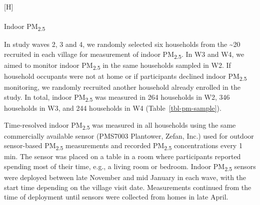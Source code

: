 \documentclass[
  letterpaper,
  DIV=11,
  numbers=noendperiod]{scrartcl}
\makeatletter
\let\oldparagraph\paragraph
\renewcommand{\paragraph}{
    \@ifstar
      \xxxParagraphStar
      \xxxParagraphNoStar
  }
\newcommand{\xxxParagraphStar}[1]{\oldparagraph*{#1}\mbox{}}
\newcommand{\xxxParagraphNoStar}[1]{\oldparagraph{#1}\mbox{}}
\renewenvironment{figure}%
   {\renewcommand\familydefault\sfdefault
    \@float{figure}}
   {\end@float}
\makeatother
\begin{document}
\begin{figure}[H]


\caption{\label{fig-calibration}Calibration of real-time sensors against
a reference monitor at University of the Chinese Academy of Sciences.}

\end{figure}%

\paragraph{\texorpdfstring{Indoor
PM\textsubscript{2.5}}{Indoor PM2.5}}\label{indoor-pm2.5}

In study waves 2, 3 and 4, we randomly selected six households from the
\textasciitilde20 recruited in each village for measurement of indoor
PM\textsubscript{2.5}. In W3 and W4, we aimed to monitor indoor
PM\textsubscript{2.5} in the same households sampled in W2. If household
occupants were not at home or if participants declined indoor
PM\textsubscript{2.5} monitoring, we randomly recruited another
household already enrolled in the study. In total, indoor
PM\textsubscript{2.5} was measured in 264 households in W2, 346
households in W3, and 244 households in W4 (Table~\ref{tbl-pm-sample}).

Time-resolved indoor PM\textsubscript{2.5} was measured in all
households using the same commercially available sensor (PMS7003
Plantower, Zefan, Inc.) used for outdoor sensor-based
PM\textsubscript{2.5} measurements and recorded PM\textsubscript{2.5}
concentrations every 1 min. The sensor was placed on a table in a room
where participants reported spending most of their time, e.g., a living
room or bedroom. Indoor PM\textsubscript{2.5} sensors were deployed
between late November and mid January in each wave, with the start time
depending on the village visit date. Measurements continued from the
time of deployment until sensors were collected from homes in late
April.
\end{document}
